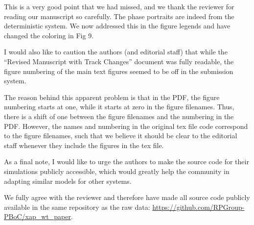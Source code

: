 \documentclass[11pt,letterpaper]{article}
\begin{document}
\begin{response}
	This is a very good point that we had missed, and we thank the reviewer for reading our manuscript so carefully. The phase portraits are indeed from the deterministic system. We now addressed this in the figure legends and have changed the coloring in Fig 9.
\end{response}

\begin{review}
	I would also like to caution the authors (and editorial staff) that while the ``Revised Manuscript with Track Changes'' document was fully readable, the figure numbering of the main text figures seemed to be off in the submission system.
\end{review}

\begin{response}
	The reason behind this apparent problem is that in the PDF, the figure numbering starts at one, while it starts at zero in the figure filenames. Thus, there is a shift of one between the figure filenames and the numbering in the PDF. However, the names and numbering in the original tex file code correspond to the figure filenames, such that we believe it should be clear to the editorial staff whenever they include the figures in the tex file.
\end{response}

\begin{review}
	As a final note, I would like to urge the authors to make the source code for their simulations publicly accessible, which would greatly help the community in adapting similar models for other systems.
\end{review}

\begin{response}
	We fully agree with the reviewer and therefore have made all source code publicly available in the same repository as the raw data: \url{https://github.com/RPGroup-PBoC/xap_wt_paper}.
\end{response}

%
\end{document}
